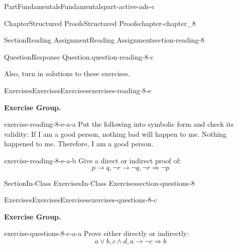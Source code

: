 \documentclass[oneside,10pt,]{book}
\numberwithin{equation}{section}
\begin{document}
\begin{partptx}{Part}{Fundamentals}{}{Fundamentals}{}{}{part-active-ads-c}
\begin{chapterptx}{Chapter}{Structured Proofs}{}{Structured Proofs}{}{}{chapter-chapter_8}
\begin{sectionptx}{Section}{Reading Assignment}{}{Reading Assignment}{}{}{section-reading-8}
\begin{question}{Question}{Response Question.}{question-reading-8-c}
\end{question}
Also, turn in solutions to these exercises.%
%
%
\typeout{************************************************}
\typeout{************************************************}
%
\begin{exercises-subsection-numberless}{Exercises}{Exercises}{}{Exercises}{}{}{exercises-reading-8-e}
\par\medskip\noindent%
\textbf{Exercise Group.}\space\space%
\begin{exercisegroup}
\begin{divisionexerciseeg}{1}{}{}{exercise-reading-8-e-a-a}%
Put the following into symbolic form and check its validity: If I am a good person, nothing bad will happen to me. Nothing happened to me. Therefore, I am a good person.%
\end{divisionexerciseeg}%
\begin{divisionexerciseeg}{2}{}{}{exercise-reading-8-e-a-b}%
Give  a direct or indirect proof of:%
\begin{equation*}
p\rightarrow  q, \neg r\rightarrow  \neg q, \neg r \Rightarrow  \neg p
\end{equation*}
%
\end{divisionexerciseeg}%
\end{exercisegroup}
\par\medskip\noindent
\end{exercises-subsection-numberless}
\end{sectionptx}
%
%
\typeout{************************************************}
\typeout{************************************************}
%
\begin{sectionptx}{Section}{In-Class Exercises}{}{In-Class Exercises}{}{}{section-questions-8}
%
%
%
\typeout{************************************************}
\typeout{************************************************}
%
\begin{exercises-subsection-numberless}{Exercises}{Exercises}{}{Exercises}{}{}{exercises-questions-8-c}
\par\medskip\noindent%
\textbf{Exercise Group.}\space\space%
\begin{exercisegroup}
\begin{divisionexerciseeg}{1}{}{}{exercise-questions-8-c-a-a}%
Prove either directly or indirectly:%
\begin{equation*}
a \lor  b, c \land  d, a \rightarrow  \neg c \Rightarrow  b
\end{equation*}

\end{divisionexerciseeg}
\end{exercisegroup}
\end{exercises-subsection-numberless}
\end{sectionptx}
\end{chapterptx}
\end{partptx}
\end{document}
